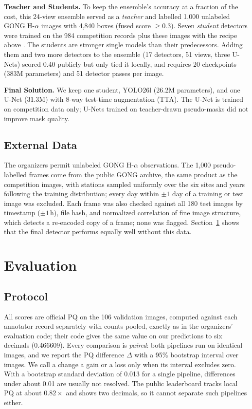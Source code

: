 \documentclass[sigconf]{acmart}
\begin{document}
    \textbf{Teacher and Students.} To keep the ensemble's accuracy at a fraction of the cost, this 24-view ensemble served as a \emph{teacher} and labelled 1,000 unlabeled GONG H-$\alpha$ images with 4,840 boxes (fused score $\geq 0.3$). Seven \emph{student} detectors were trained on the 984 competition records plus these images with the recipe above \cite{lee2013pseudo,xie2020noisystudent}. The students are stronger single models than their predecessors. Adding them and two more detectors to the ensemble (17 detectors, 51 views, three U-Nets) scored 0.40 publicly but only tied it locally, and requires 20 checkpoints (383M parameters) and 51 detector passes per image.

    \textbf{Final Solution.} We keep one student, YOLO26l (26.2M parameters), and one U-Net (31.3M) with 8-way test-time augmentation (TTA). The U-Net is trained on competition data only; U-Nets trained on teacher-drawn pseudo-masks did not improve mask quality.

\subsection{External Data}
The organizers permit unlabeled GONG H-$\alpha$ observations. The 1,000 pseudo-labelled frames come from the public GONG archive, the same product as the competition images, with stations sampled uniformly over the six sites and years following the training distribution; every day within $\pm1$ day of a training or test image was excluded. Each frame was also checked against all 180 test images by timestamp ($\pm1$\,h), file hash, and normalized correlation of fine image structure, which detects a re-encoded copy of a frame; none was flagged. Section~\ref{sec:evaluation} shows that the final detector performs equally well without this data.


\section{Evaluation}\label{sec:evaluation}
\subsection{Protocol}
All scores are official PQ on the 106 validation images, computed against each annotator record separately with counts pooled, exactly as in the organizers' evaluation code; their code gives the same value on our predictions to six decimals (0.466609). Every comparison is \emph{paired}: both pipelines run on identical images, and we report the PQ difference $\Delta$ with a 95\% bootstrap interval over images. We call a change a gain or a loss only when its interval excludes zero. With a bootstrap standard deviation of 0.013 for a single pipeline, differences under about 0.01 are usually not resolved. The public leaderboard tracks local PQ at about $0.82\times$ and shows two decimals, so it cannot separate such pipelines either.
\end{document}
